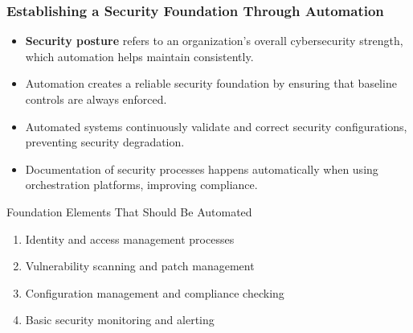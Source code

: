 \documentclass{beamer}
\begin{document}
\begin{frame}
  \frametitle{Establishing a Security Foundation Through Automation}
  
  \begin{itemize}
    \item \textbf{Security posture} refers to an organization's overall cybersecurity strength, which automation helps maintain consistently.
    \item Automation creates a reliable security foundation by ensuring that baseline controls are always enforced.
    \item Automated systems continuously validate and correct security configurations, preventing security degradation.
    \item Documentation of security processes happens automatically when using orchestration platforms, improving compliance.
  \end{itemize}
  
  \begin{alertblock}{Foundation Elements That Should Be Automated}
    \scriptsize
    \begin{enumerate}
      \item Identity and access management processes
      \item Vulnerability scanning and patch management
      \item Configuration management and compliance checking
      \item Basic security monitoring and alerting
    \end{enumerate}
  \end{alertblock}
\end{frame}
\end{document}
